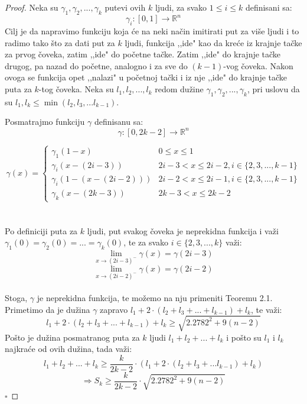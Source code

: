 \documentclass[11pt,letter]{article}
\newcommand{\qed}{\hfill $\square$ \bigskip}
\begin{document}
\begin{proof}
Neka su $\gamma_1, \gamma_2,..., \gamma_k$ putevi ovih $k$ ljudi, za svako $1\leqslant i\leqslant k$ definisani sa:
$$\gamma_i: [0,1]\to \mathbb{R}^n$$
\indent Cilj je da napravimo funkciju koja \' ce na neki na\v cin imitirati put za vi\v se ljudi i to radimo tako \v sto za dati put za $k$ ljudi, funkcija ,,ide" kao da kre\' ce iz krajnje ta\v cke za prvog \v coveka, zatim ,,ide" do po\v cetne ta\v cke. Zatim ,,ide" do krajnje ta\v cke drugog, pa nazad do po\v cetne, analogno i za sve do $(k-1)$-vog \v coveka.  Nakon ovoga se funkcija opet ,,nalazi" u po\v cetnoj ta\v cki i iz nje ,,ide" do krajnje ta\v cke puta za $k$-tog \v coveka.
Neka su $l_1, l_2,...,l_k$ redom du\v zine $\gamma_1, \gamma_2,..., \gamma_k$, pri uslovu da su $l_1, l_k\leqslant \min(l_2,l_3,...l_{k-1}).$

 Posmatrajmo funkciju $\gamma$ definisanu sa:
$$\gamma: [0, 2k-2]\to \mathbb{R}^n$$

\[ \gamma(x) = \begin{cases}  
          \gamma_1(1-x) & 0\leqslant x\leqslant 1 \\
          \gamma_i(x-(2i-3)) & 2i-3< x \leqslant2i-2, i\in\{2,3,...,k-1\}\\
	 \gamma_i (1-(x-(2i-2)))& 2i-2< x\leqslant 2i-1, i \in\{2,3,...,k-1\}\\
          \gamma_k(x-(2k-3)) & 2k-3<x \leqslant 2k-2
       \end{cases}
 \]
\\
\\
\indent Po definiciji puta za $k$ ljudi, put svakog \v coveka je neprekidna funkcija i va\v zi $\gamma_1(0)=\gamma_2(0)=...=\gamma_k(0)$, te za svako $i\in \{2,3,...,k\}$ va\v zi:
$$\lim_{x\to (2i-3)^-}\gamma(x)=\gamma(2i-3)$$
$$\lim_{x\to (2i-2)^-}\gamma(x)=\gamma(2i-2)$$
\\
\indent Stoga,  $\gamma$ je neprekidna funkcija, te mo\v zemo na nju primeniti Teoremu 2.1. Primetimo da je du\v zina $\gamma$ zapravo $l_1+2\cdot(l_2+l_3+...+l_{k-1})+l_k$, te va\v zi:
$$l_1+2\cdot(l_2+l_3+...+l_{k-1})+l_k\geqslant\sqrt{2.2782^2+9(n-2)}$$
\indent Po\v sto je du\v zina posmatranog puta za $k$ ljudi $l_1+l_2+...+l_k$ i po\v sto su $l_1$ i $l_k$ najkra\' ce od ovih du\v zina, tada va\v zi:
$$l_1+l_2+...+l_k\geqslant \frac{k}{2k-2}\cdot (l_1+2\cdot(l_2+l_3+...l_{k-1})+l_k)$$
$$\Longrightarrow S_k\geqslant \frac{k}{2k-2}\cdot \sqrt{2.2782^2+9(n-2)}$$\qed
\end{proof}
\end{document}
